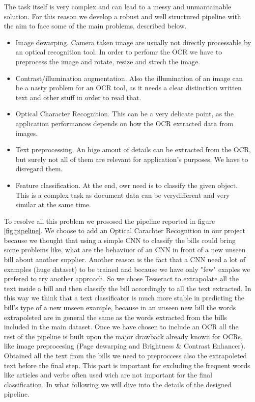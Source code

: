 \documentclass[10pt,twocolumn,letterpaper]{article}
\begin{document}
The task itself is very complex and can lead to a messy and
unmantainable solution. For this reason we develop a robust and well
structured pipeline with the aim to face some of the main problems,
described below.
\begin{itemize}
	\item Image dewarping. Camera taken image are usually not directly
	processable by an optical recognition tool. In order to perfomr
	the OCR we have to preprocess the image and rotate, resize and
	strech the image.
	\item Contrast/illumination augmentation. Also the illumination of an
	image can be a nasty problem for an OCR tool, as it needs a clear
	distinction written text and other stuff in order to read that.
	\item Optical Character Recognition. This can be a very delicate
	point, as the application performances depends on how the OCR
	extracted data from images.
	\item Text preprocessing. An hige amout of details can be extracted
	from the OCR, but surely not all of them are relevant for
	application's purposes. We have to disregard them.
	\item Feature classification. At the end, owr need is to classify the
	given object. This is a complex task as document data can be verydifferent and very similar at the same time.
\end{itemize}

To resolve all this problem we prososed the pipeline reported in figure \ref{fig:pipeline}. We choose to add an Optical Carachter Recognition in our project because we thought that using a simple CNN to classify the bills could bring some problems like, what are the behaviuor of an CNN in front of a new unseen bill about another supplier. Another reason is the fact that a CNN need a lot of examples (huge dataset) to be trained and because we have only "few" exaples we prefered to try another approach. So we chose Tesseract to extrapolate all the text inside a bill and then classify the bill accordingly to all the text extracted. In this way we think that a text classificator is much more stable in predicting the bill's type of a new unseen example, because in an unseen new bill the words extrapoleted are in general the same as the words extracted from the bills included in the main dataset. Once we have chosen to include an OCR all the rest of the pipeline is built upon the major drawback already known for OCRs, like image preprocesing (Page dewarping and Brightness \& Contrast Enhancer). Obtained all the text from the bills we need to preproccess also the extrapoleted text before the final step. This part is important for excluding the frequent words like articles and verbs often used wich are not important for the final classification. In what following we will dive into the details of the designed pipeline.
\end{document}
